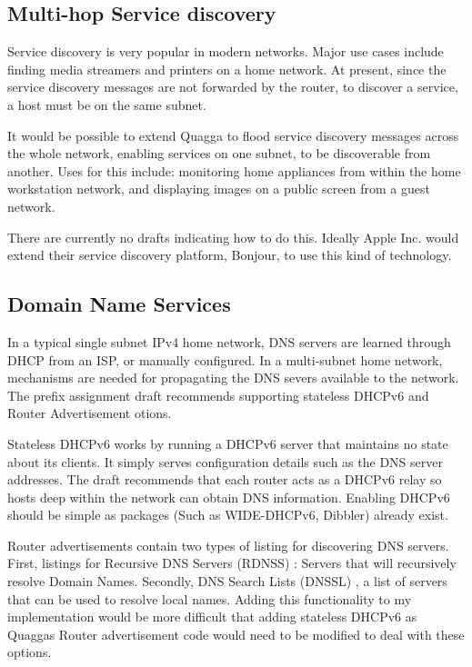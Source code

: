 \documentclass[12pt,a4paper,twoside]{report}
\begin{document}
\subsection{Multi-hop Service discovery}
Service discovery is very popular in modern networks. Major use cases include
finding media streamers and printers on a home network. At present, since the
service discovery messages are not forwarded by the router, to discover a
service, a host must be on the same subnet.

It would be possible to extend Quagga to flood service discovery
messages across the whole network, enabling services on one subnet, to be
discoverable from another. Uses for this include: monitoring home appliances from
within the home workstation network, and displaying images on a public screen
from a guest network.

There are currently no drafts indicating how to do this. Ideally Apple Inc.\@
would extend their service discovery platform, Bonjour, to use this kind of
technology.

\subsection{Domain Name Services}
In a typical single subnet IPv4 home network, DNS servers  are learned through
DHCP from an ISP, or manually configured. In a multi-subnet home network,
mechanisms are needed for propagating the DNS severs available to the network.
The prefix assignment draft recommends supporting stateless DHCPv6 and Router
Advertisement otions.

Stateless DHCPv6 works by running a DHCPv6 server that maintains no state about
its clients. It simply serves configuration details such as the DNS server
addresses. The draft recommends that each router acts as a DHCPv6 relay so
hosts deep within the network can obtain DNS information.  Enabling DHCPv6
should be simple as packages (Such as WIDE-DHCPv6, Dibbler) already exist. 

Router advertisements contain two types of listing for discovering DNS servers.
First, listings for Recursive DNS Servers (RDNSS)
: Servers that will recursively
resolve Domain Names. Secondly, DNS Search Lists (DNSSL)
, a list of servers that can be used to
resolve local names. Adding this functionality to my implementation would be
more difficult that adding stateless DHCPv6 as Quaggas Router advertisement
code would need to be modified to deal with these options.
\end{document}
